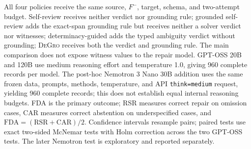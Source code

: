 \documentclass[10pt]{article}
\newcommand{\method}{\textsc{DeGro}}
\newcommand{\code}[1]{{\footnotesize\nolinkurl{#1}}}
\begin{document}
All four policies receive the same source, $F^-$, target, schema, and two-attempt budget. Self-review receives neither verdict nor grounding rule; grounded self-review adds the exact-span grounding rule but receives neither a solver verdict nor witnesses; determinacy-guided adds the typed ambiguity verdict without grounding; \method{} receives both the verdict and grounding rule. The main comparison does not expose witness values to the repair model. GPT-OSS 20B and 120B use medium reasoning effort and temperature 1.0, giving 960 complete records per model. The post-hoc Nemotron 3 Nano 30B addition uses the same frozen data, prompts, methods, temperature, and API \code{think=medium} request, yielding 960 complete records; this does not establish equal internal reasoning budgets. FDA is the primary outcome; RSR measures correct repair on omission cases, CAR measures correct abstention on underspecified cases, and $\mathrm{FDA}=(\mathrm{RSR}+\mathrm{CAR})/2$. Confidence intervals resample pairs; paired tests use exact two-sided McNemar tests with Holm correction across the two GPT-OSS tests. The later Nemotron test is exploratory and reported separately.
\end{document}
